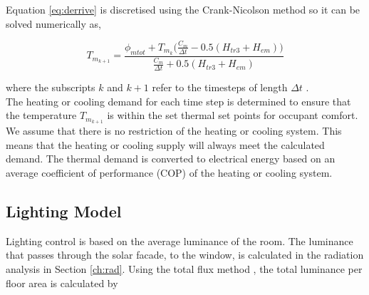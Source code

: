 



Equation \ref{eq:derrive} is discretised using the Crank-Nicolson method so it can be solved numerically as,


\begin{equation} 
\label{eq:derivation}
      T_{m_{k+1}}={\frac{\phi_{mtot}+T_{m_k}\Big(\frac{C_m}{\Delta t} - 0.5(H_{tr3}+H_{em})\Big)}{\frac{C_m}{\Delta t} + 0.5(H_{tr3}+H_{em})}}
\end{equation}

where the subscripts $k$ and $k+1$ refer to the timesteps of length $\Delta t$ \cite{crank1947practical}.\\

The heating or cooling demand for each time step is determined to ensure that the temperature $T_{m_{k+1}}$ is within the set thermal set points for occupant comfort. We assume that there is no restriction of the heating or cooling system. This means that the heating or cooling supply will always meet the calculated demand. The thermal demand is converted to electrical energy based on an average coefficient of performance (COP) of the heating or cooling system. 

\subsection{Lighting Model}
Lighting control is based on the average luminance of the room. The luminance that passes through the solar facade, to the window, is calculated in the radiation analysis in Section \ref{ch:rad}. Using the total flux method \cite{szokolay1980handbook}, the total luminance per floor area is calculated by 

